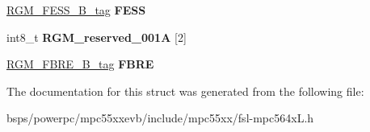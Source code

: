 \begin{DoxyCompactItemize}
\item 
\mbox{\label{structRGM__struct__tag_a1d7deb6fa682a7666dd3b198cbd1a0e7}} 
\mbox{\hyperlink{unionRGM__FESS__16B__tag}{R\+G\+M\+\_\+\+F\+E\+S\+S\+\_\+B\+\_\+tag}} {\bfseries F\+E\+SS}
\item 
\mbox{\label{structRGM__struct__tag_a9b66b7225115cec79531bdd208a3e792}} 
int8\+\_\+t {\bfseries R\+G\+M\+\_\+reserved\+\_\+001A} \mbox{[}2\mbox{]}
\item 
\mbox{\label{structRGM__struct__tag_aeceef82b547a8f2b63477207f7b2ff8e}} 
\mbox{\hyperlink{unionRGM__FBRE__16B__tag}{R\+G\+M\+\_\+\+F\+B\+R\+E\+\_\+B\+\_\+tag}} {\bfseries F\+B\+RE}
\end{DoxyCompactItemize}


The documentation for this struct was generated from the following file\+:\begin{DoxyCompactItemize}
\item 
bsps/powerpc/mpc55xxevb/include/mpc55xx/fsl-\/mpc564x\+L.\+h\end{DoxyCompactItemize}
